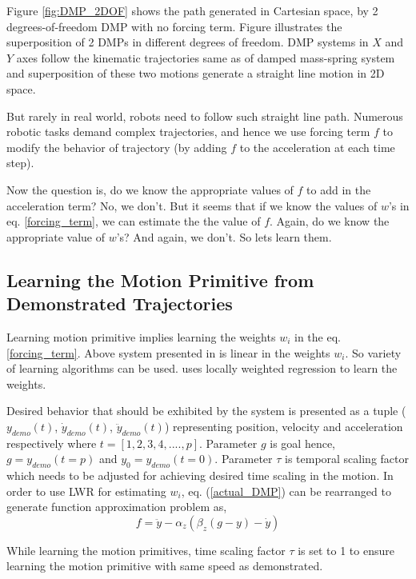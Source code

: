 Figure \ref{fig:DMP_2DOF} shows the path generated in Cartesian space, by 2 degrees-of-freedom DMP with no forcing term. Figure illustrates the superposition of 2 DMPs in different degrees of freedom. DMP systems in $X$ and $Y$ axes follow the kinematic trajectories same as of damped mass-spring system and superposition of these two motions generate a straight line motion in 2D space. 

But rarely in real world, robots need to follow such straight line path. Numerous robotic tasks demand complex trajectories, and hence we use forcing term $f$ to modify the behavior of trajectory (by adding $f$ to the acceleration at each time step).

Now the question is, do we know the appropriate values of $f$ to add in the acceleration term? No, we don't. But it seems that if we know the values of $w$'s in eq. \ref{forcing_term}, we can estimate the the value of $f$. Again, do we know the appropriate value of $w$'s? And again, we don't. So lets learn them. 

\subsection{Learning the Motion Primitive from Demonstrated Trajectories}\label{learn_DMP}
\par Learning motion primitive implies learning the weights $w_{i}$ in the eq. \ref{forcing_term}. Above system presented in \cite{ijspeert2013dynamical} is linear in the weights $w_{i}$. So variety of learning algorithms can be used. \cite{ijspeert2013dynamical} uses locally weighted regression to learn the weights. 

Desired behavior that should be exhibited by the system is presented as a tuple ($y_{demo}(t)$, $\dot{y}_{demo}(t)$, $\ddot{y}_{demo}(t)$) representing position, velocity and acceleration respectively where $t = [1,2,3,4,....,p]$. Parameter $g$ is goal hence, $g = y_{demo}(t = p)$ and $y_{0} = y_{demo}(t = 0)$. Parameter $\tau$ is temporal scaling factor which needs to be adjusted for achieving desired time scaling in the motion. In order to use LWR for estimating $w_{i}$, eq. (\ref{actual_DMP}) can be rearranged to generate function approximation problem as,
\begin{equation}
f = \ddot{y} - \alpha_{z}(\beta_{z}(g - y) - \dot{y})
\end{equation}

While learning the motion primitives, time scaling factor $\tau$ is set to 1 to ensure learning the motion primitive with same speed as demonstrated. 

